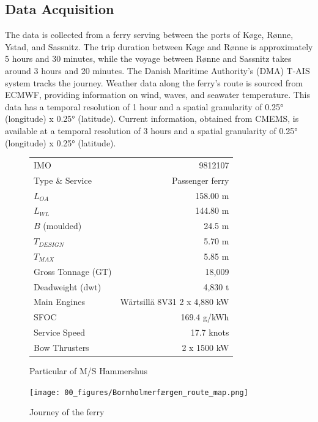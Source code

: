\documentclass[]{interact}
\theoremstyle{plain}%
\theoremstyle{definition}
\theoremstyle{remark}
\begin{document}
\subsection{Data Acquisition}\label{sec:data_acquisition}

The data is collected from a ferry serving between the ports of K{\o}ge, R{\o}nne, Ystad, and Sassnitz. The trip duration between K{\o}ge and R{\o}nne is approximately 5 hours and 30 minutes, while the voyage between Rønne and Sassnitz takes around 3 hours and 20 minutes. The Danish Maritime Authority's (DMA) T-AIS system tracks the journey. Weather data along the ferry's route is sourced from ECMWF, providing information on wind, waves, and seawater temperature. This data has a temporal resolution of 1 hour and a spatial granularity of 0.25° (longitude) x 0.25° (latitude). Current information, obtained from CMEMS, is available at a temporal resolution of 3 hours and a spatial granularity of 0.25° (longitude) x 0.25° (latitude).

\begin{figure}[ht]
  \begin{minipage}{0.55\linewidth} %
    \footnotesize
    \centering
    \begin{tabular}{l r}
        \hline
        IMO & 9812107 \\
        Type \& Service & Passenger ferry \\
        $L_{OA}$ & 158.00 m\\
        $L_{WL}$ & 144.80 m\\
        $B$ (moulded) & 24.5 m\\
        $T_{DESIGN}$ & 5.70 m\\
        $T_{MAX}$ & 5.85 m \\ 
        Gross Tonnage (GT) & 18,009 \\
        Deadweight (dwt) & 4,830 t \\
        Main Engines & Wärtsillä 8V31 2 x 4,880 kW \\
        SFOC & 169.4 g/kWh \\
        Service Speed & 17.7 knots \\
        Bow Thrusters & 2 x 1500 kW \\
        \hline
    \end{tabular}
    \caption{Particular of M/S Hammershus}
    \label{tbl:Hammershus_Data}
  \end{minipage}
  \hspace{0.01\linewidth}
  \begin{minipage}{0.43\linewidth} %
    \centering
    \texttt{[image: 00\_figures/Bornholmerfærgen\_route\_map.png]} %
    \caption{Journey of the ferry}
    \label{fig:Hammershus_journey_map}
  \end{minipage}
\end{figure}
\end{document}
